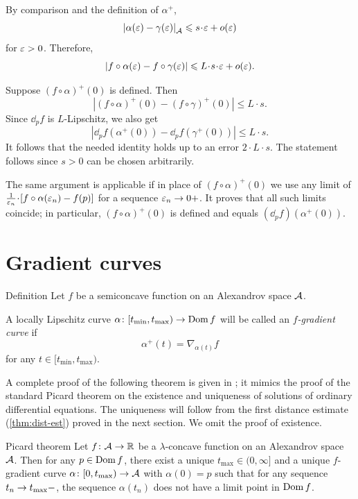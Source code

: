 By comparison and the definition of $\alpha^+$,
\[\dist{\alpha(\eps)}{\gamma(\eps)}{\spc{A}}\le s\cdot\eps+o(\eps)\]
for $\varepsilon>0$.
Therefore,
\[|f\circ\alpha(\eps)-f\circ\gamma(\eps)|\le L\cdot s\cdot\eps+o(\eps).\]

Suppose $(f\circ\alpha)^+(0)$ is defined.
Then
\[|(f\circ\alpha)^+(0)-(f\circ\gamma)^+(0)|\le L\cdot s.\]
Since $\dd_pf$ is $L$-Lipschitz, we also get 
\[|\dd_pf(\alpha^+(0))-\dd_pf(\gamma^+(0))|\le L\cdot s.\]
It follows that the needed identity holds up to an error $2\cdot L\cdot s$.
The statement follows since $s>0$ can be chosen arbitrarily.

The same argument is applicable if in place of $(f\circ\alpha)^+(0)$
we use any limit of $\tfrac1{\eps_n}\cdot [f\circ\alpha(\eps_n)-f(p)]$ for a sequence $\varepsilon_n\to 0+$.
It proves that all such limits coincide; in particular, $(f\circ\alpha)^+(0)$ is defined and equals $(\dd_pf)(\alpha^+(0))$.
\qeds


\section{Gradient curves}

\begin{thm}{Definition}\label{def:grad-curve}
Let $f$ be a semiconcave function on an Alexandrov space $\mathcal{A}$.

A locally Lipschitz curve $\alpha\colon[t_{\min},t_{\max})\to\mathop{\rm Dom}\nolimits f$ will be called an \emph{$f$-gradient curve} if
\[\alpha^+(t)=\nabla_{\alpha(t)} f\]
for any $t\in[t_{\min},t_{\max})$.
\end{thm}

A complete proof of the following theorem is given in \cite[16.15]{alexander-kapovitch-petrunin2024};
it mimics the proof of the standard Picard theorem on the existence and uniqueness of solutions of ordinary differential equations.
The uniqueness will follow from the first distance estimate (\ref{thm:dist-est}) proved in the next section.
We omit the proof of existence.

\begin{thm}{Picard theorem}\label{thm:glob-exist-grad-curv}
Let $f\colon\mathcal{A}\to \mathbb{R}$ be a $\lambda$-concave function on an Alexandrov space $\mathcal{A}$.
Then for any $p\z\in \Dom f$, there exist a unique $t_{\max}\in(0,\infty]$ and a unique $f$-gradient curve $\alpha\colon[0,t_{\max})\to \mathcal{A}$ with $\alpha(0)=p$ such that for any sequence $t_n\z\to t_{\max}-$, the sequence $\alpha(t_n)$ does not have a limit point in $\mathop{\rm Dom}\nolimits f$.
\end{thm}

